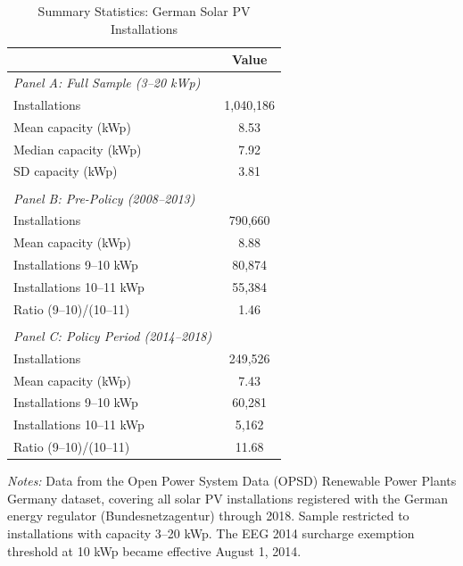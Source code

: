 \begin{table}[htbp]
\centering
\caption{Summary Statistics: German Solar PV Installations}
\label{tab:summary}
\begin{tabular}{lc}
\hline\hline
 & Value \\
\hline
\textit{Panel A: Full Sample (3--20 kWp)} &  \\
\quad Installations & 1,040,186 \\
\quad Mean capacity (kWp) & 8.53 \\
\quad Median capacity (kWp) & 7.92 \\
\quad SD capacity (kWp) & 3.81 \\
 &  \\
\textit{Panel B: Pre-Policy (2008--2013)} &  \\
\quad Installations & 790,660 \\
\quad Mean capacity (kWp) & 8.88 \\
\quad Installations 9--10 kWp & 80,874 \\
\quad Installations 10--11 kWp & 55,384 \\
\quad Ratio (9--10)/(10--11) & 1.46 \\
 &  \\
\textit{Panel C: Policy Period (2014--2018)} &  \\
\quad Installations & 249,526 \\
\quad Mean capacity (kWp) & 7.43 \\
\quad Installations 9--10 kWp & 60,281 \\
\quad Installations 10--11 kWp & 5,162 \\
\quad Ratio (9--10)/(10--11) & 11.68 \\
\hline\hline
\end{tabular}
\begin{tablenotes}
\small
\item \textit{Notes:} Data from the Open Power System Data (OPSD) Renewable Power Plants Germany dataset, covering all solar PV installations registered with the German energy regulator (Bundesnetzagentur) through 2018. Sample restricted to installations with capacity 3--20 kWp. The EEG 2014 surcharge exemption threshold at 10 kWp became effective August 1, 2014.
\end{tablenotes}
\end{table}
